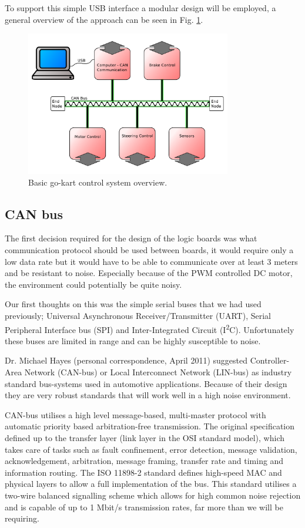 To support this simple USB interface a modular design will be employed, a
general overview of the approach can be seen in Fig. \ref{can-design}.

\begin{figure}
  \centering
  \includegraphics[width=0.8\textwidth]{../../Images/can_diagram.pdf}
  \caption{Basic go-kart control system overview.\label{can-design}}
\end{figure}

\subsection{CAN bus}

The first decision required for the design of the logic boards was what
communication protocol should be used between boards, it would require only a
low data rate but it would have to be able to communicate over at least 3 meters
and be resistant to noise.  Especially because of the PWM controlled DC motor,
the environment could potentially be quite noisy.

Our first thoughts on this was the simple serial buses that we had used
previously; Universal Asynchronous Receiver/Transmitter (UART), Serial
Peripheral Interface bus (SPI) and Inter-Integrated Circuit
(I\textsuperscript{2}C).  Unfortunately these buses are limited in range and can
be highly susceptible to noise.

Dr. Michael Hayes (personal correspondence, April 2011) suggested
Controller-Area Network (CAN-bus) or Local Interconnect Network (LIN-bus) as
industry standard bus-systems used in automotive applications.  Because of their
design they are very robust standards that will work well in a high noise
environment.

CAN-bus utilises a high level message-based, multi-master protocol with
automatic priority based arbitration-free transmission.  The original
specification defined up to the transfer layer (link layer in the OSI standard
model), which takes care of tasks such as fault confinement, error detection,
message validation, acknowledgement, arbitration, message framing, transfer rate
and timing and information routing.  The ISO 11898-2 standard defines high-speed
MAC and physical layers to allow a full implementation of the bus.  This
standard utilises a two-wire balanced signalling scheme which allows for high
common noise rejection and is capable of up to 1 Mbit/s transmission rates, far
more than we will be requiring.

